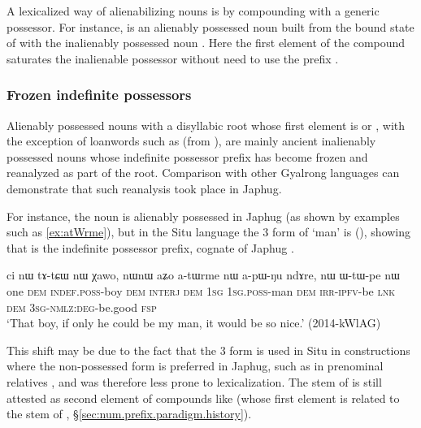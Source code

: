 A lexicalized way of alienabilizing nouns is by compounding with a generic possessor. For instance,  is an alienably possessed noun built from the bound state of  with the inalienably possessed noun . Here the first element of the compound  saturates the inalienable possessor without need to use the prefix .
 
\subsubsection{Frozen indefinite possessors} \label{sec:frozen.indef}
Alienably possessed nouns with a disyllabic root whose first element is  or , with the exception of loanwords such as  (from ), are mainly ancient inalienably possessed nouns whose indefinite possessor prefix  has become frozen and reanalyzed as part of the root. Comparison with other Gyalrong languages can demonstrate that such reanalysis took place in Japhug.

For instance, the noun  is alienably possessed in Japhug (as shown by examples such as \ref{ex:atWrme}), but in the Situ language the 3\sg{} form of  `man' is  (\citealt[183;197]{lin09phd}), showing that  is the indefinite possessor prefix, cognate of Japhug . 

\begin{exe}
\ex \label{ex:atWrme}
\gll ci nɯ tɤ-tɕɯ nɯ χawo, nɯnɯ aʑo a-tɯrme nɯ a-pɯ-ŋu ndɤre, nɯ ɯ-tɯ-pe nɯ\\
one \textsc{dem} \textsc{indef}.\textsc{poss}-boy \textsc{dem} \textsc{interj} \textsc{dem} \textsc{1sg} \textsc{1sg}.\textsc{poss}-man \textsc{dem} \textsc{irr}-\textsc{ipfv}-be \textsc{lnk} \textsc{dem} \textsc{3sg}-\textsc{nmlz}:\textsc{deg}-be.good \textsc{fsp} \\
\glt `That boy, if only he could be my man, it would be so nice.' (2014-kWlAG)
\end{exe}

This shift may be due to the fact that the 3\sg{} form is used in Situ in constructions where the non-possessed form is preferred in Japhug, such as in prenominal relatives \citep[190]{lin09phd}, and was therefore less prone to lexicalization. The stem  of  is still attested as second element of compounds like  (whose first element  is related to the stem of , §\ref{sec:num.prefix.paradigm.history}). 

